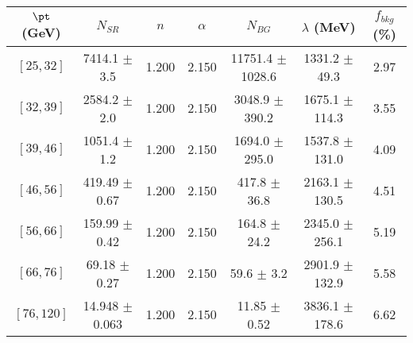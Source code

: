 \begin{tabular}{c||c|c|c|c|c||c}
$\pt$ (GeV) & $N_{SR}$ & $n$ & $\alpha$ & $N_{BG}$  & $\lambda$ (MeV) & $f_{bkg}$ (\%) \\
\hline
$[25, 32]$ & 7414.1 $\pm$ 3.5 & 1.200 & 2.150 & 11751.4 $\pm$ 1028.6 & 1331.2 $\pm$ 49.3 & 2.97\\
$[32, 39]$ & 2584.2 $\pm$ 2.0 & 1.200 & 2.150 & 3048.9 $\pm$ 390.2 & 1675.1 $\pm$ 114.3 & 3.55\\
$[39, 46]$ & 1051.4 $\pm$ 1.2 & 1.200 & 2.150 & 1694.0 $\pm$ 295.0 & 1537.8 $\pm$ 131.0 & 4.09\\
$[46, 56]$ & 419.49 $\pm$ 0.67 & 1.200 & 2.150 & 417.8 $\pm$ 36.8 & 2163.1 $\pm$ 130.5 & 4.51\\
$[56, 66]$ & 159.99 $\pm$ 0.42 & 1.200 & 2.150 & 164.8 $\pm$ 24.2 & 2345.0 $\pm$ 256.1 & 5.19\\
$[66, 76]$ & 69.18 $\pm$ 0.27 & 1.200 & 2.150 & 59.6 $\pm$ 3.2 & 2901.9 $\pm$ 132.9 & 5.58\\
$[76, 120]$ & 14.948 $\pm$ 0.063 & 1.200 & 2.150 & 11.85 $\pm$ 0.52 & 3836.1 $\pm$ 178.6 & 6.62\\
\end{tabular}
